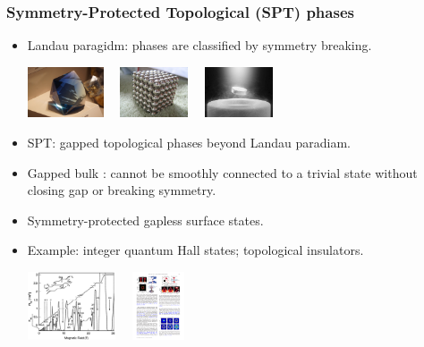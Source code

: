 \documentclass[xcolor=table, 11pt, aspectratio=169]{beamer}
\begin{document}
\begin{frame}
  \frametitle{Symmetry-Protected Topological (SPT) phases}
  \begin{itemize}
  \item Landau paragidm: phases are classified by symmetry breaking.
    \begin{center}
      \includegraphics[height=1.5cm]{../resources/crystal}~~
      \includegraphics[height=1.5cm]{../resources/magnet}~~
      \includegraphics[height=1.5cm]{../resources/sc}
    \end{center}
  \item SPT: gapped topological phases beyond Landau paradiam.
  \item Gapped bulk : cannot be smoothly connected to a trivial state without closing gap or breaking symmetry.
  \item Symmetry-protected gapless surface states.
  \item Example: integer quantum Hall states; topological insulators.
    \begin{center}
      \includegraphics[height=2cm]{../resources/fqhe}~~
      \includegraphics[height=2cm]{ti_surface}
    \end{center}
  \end{itemize}
\end{frame}
\end{document}
